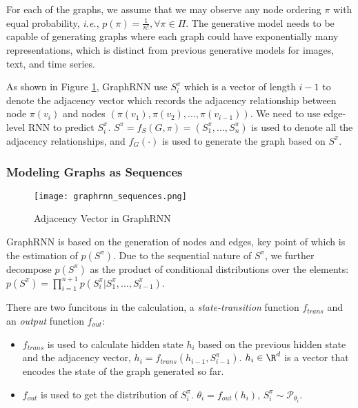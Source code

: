 \begin{survey}
For each of the graphs, we assume that we may observe any node ordering
\(\pi\) with equal probability, \emph{i.e.},
\(p(\pi) = \frac 1{n!} , \forall \pi \in \Pi\). The generative model
needs to be capable of generating graphs where each graph could have
exponentially many representations, which is distinct from previous
generative models for images, text, and time series.

As shown in Figure \ref{survey:GraphRNN}, GraphRNN use \(S_i^\pi\) which is a vector of length \(i - 1\) to denote
the adjacency vector which records the adjacency relationship between
node \(\pi(v_i)\) and nodes
\(\left(\pi(v_1), \pi(v_2),...,\pi(v_{i-1})\right)\). We need to use
edge-level RNN to predict \(S_i^\pi\).
\(S^\pi=f_S(G,\pi)=(S_1^\pi, ..., S_n^\pi)\) is used to denote all the
adjacency relationships, and \(f_G(·)\) is used to generate the graph
based on \(S^\pi\).

\subsubsection{Modeling Graphs as Sequences}

\begin{figure}
  \centering
  \texttt{[image: graphrnn\_sequences.png]}
  \caption*{Adjacency Vector in GraphRNN}
  \label{survey:GraphRNN}
\end{figure}

GraphRNN is based on the generation of nodes and edges, key point of
which is the estimation of \(p(S^\pi)\). Due to the sequential nature of
\(S^\pi\), we further decompose \(p(S^\pi)\) as the product of
conditional distributions over the elements:
\(p(S^\pi)=\prod\limits_{i=1}^{n+1}p(S_i^\pi|S_1^\pi, ...,S_{i-1}^\pi)\).

There are two funcitons in the calculation, a \emph{state-transition}
function \(f_{trans}\) and an \emph{output} function \(f_{out}\):

\begin{itemize}
\item
  \(f_{trans}\) is used to calculate hidden state \(h_i\) based on the
  previous hidden state and the adjacency vector,
  \(h_i=f_{trans}(h_{i-1}, S_{i-1}^\pi)\). \(h_i\in \R^d\) is a vector
  that encodes the state of the graph generated so far.
\item
  \(f_{out}\) is used to get the distribution of \(S_i^\pi\).
  \(\theta_i=f_{out}(h_i)\), \(S_i^\pi \sim \mathcal{P}_{\theta_{i}}\).
\end{itemize}


\end{survey}
